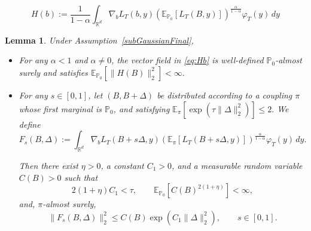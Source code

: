 \documentclass[10pt,a4paper]{amsart}
\newtheorem{lemma}{Lemma}
\newcommand{\E}{\mathbb{E}}
\begin{document}
\begin{equation}\label{eq:Hb}
H(b)
:=
\frac{1}{1-\alpha}
\int_{\mathbb R^d}
\nabla_bL_T(b,y)
\left(
\E_{\mathbb P_0}[L_T(B,y)]
\right)^{\frac{\alpha}{1-\alpha}}
\varphi_T(y)\,dy
\end{equation}

\begin{lemma}\label{lem:L22-fro}
Under Assumption~\ref{subGaussianFinal},
\begin{itemize}
    \item[(1)]
    For any $\alpha<1$ and $\alpha\neq0$, the vector field in
    \eqref{eq:Hb} is well-defined $\mathbb P_0$-almost surely and
    satisfies $\E_{\mathbb P_0}
    \left[
    \|H(B)\|_2^2
    \right]
    <\infty.$

    \item[(2)]
    For any $s\in[0,1]$, let $(B,B+\Delta)$ be distributed according
    to a coupling $\pi$ whose first marginal is $\mathbb P_0$, and satisfying $\E_\pi
\left[
\exp\!\left(\tau\|\Delta\|_2^2\right)
\right]
\leq 2.$ We define
    \[
    F_s(B,\Delta)
    :=
    \int_{\mathbb R^d}
    \nabla_bL_T(B+s\Delta,y)
    \left(
    \E_{\pi}[L_T(B+s\Delta,y)]
    \right)^{\frac{\alpha}{1-\alpha}}
    \varphi_T(y)\,dy.
    \]

    Then there exist $\eta>0$, a constant $C_1>0$, and a measurable
    random variable $C(B)>0$ such that
    \[
    2(1+\eta)C_1<\tau,
    \qquad
    \E_{\mathbb P_0}
    \left[
    C(B)^{2(1+\eta)}
    \right]
    <\infty,
    \]
    and, $\pi$-almost surely,
    \[
    \|F_s(B,\Delta)\|_2^2
    \leq
    C(B)
    \exp\!\left(C_1\|\Delta\|_2^2\right),
    \qquad s\in[0,1].
    \]
\end{itemize}
\end{lemma}
\end{document}
